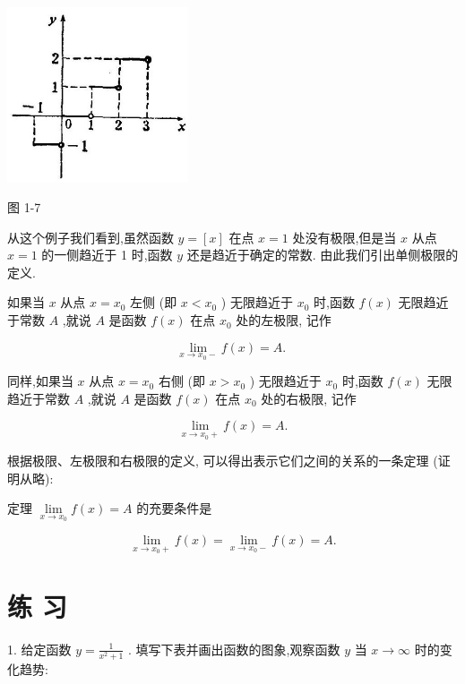 \documentclass[10pt]{article}
\begin{document}
\begin{center}
\includegraphics[max width=0.4\textwidth]{images/01912c18-5c3f-733d-b775-749ba9897a9d_25_214056.jpg}
\end{center}

图 1-7

从这个例子我们看到,虽然函数 \(y = \left\lbrack x\right\rbrack\) 在点 \(x = 1\) 处没有极限,但是当 \(x\) 从点 \(x = 1\) 的一侧趋近于 1 时,函数 \(y\) 还是趋近于确定的常数. 由此我们引出单侧极限的定义.

如果当 \(x\) 从点 \(x = {x}_{0}\) 左侧 (即 \(x < {x}_{0}\) ) 无限趋近于 \({x}_{0}\) 时,函数 \(f\left( x\right)\) 无限趋近于常数 \(A\) ,就说 \(A\) 是函数 \(f\left( x\right)\) 在点 \({x}_{0}\) 处的左极限, 记作

\[
\mathop{\lim }\limits_{{x \rightarrow {x}_{0} - }}f\left( x\right) = A\text{. }
\]

同样,如果当 \(x\) 从点 \(x = {x}_{0}\) 右侧 (即 \(x > {x}_{0}\) ) 无限趋近于 \({x}_{0}\) 时,函数 \(f\left( x\right)\) 无限趋近于常数 \(A\) ,就说 \(A\) 是函数 \(f\left( x\right)\) 在点 \({x}_{0}\) 处的右极限, 记作

\[
\mathop{\lim }\limits_{{x \rightarrow {x}_{0} + }}f\left( x\right) = A.
\]

根据极限、左极限和右极限的定义, 可以得出表示它们之间的关系的一条定理 (证明从略):

定理 \(\mathop{\lim }\limits_{{x \rightarrow {x}_{0}}}f\left( x\right) = A\) 的充要条件是

\[
\mathop{\lim }\limits_{{x \rightarrow {x}_{0} + }}f\left( x\right) = \mathop{\lim }\limits_{{x \rightarrow {x}_{0} - }}f\left( x\right) = A.
\]

\section*{练 习}

1. 给定函数 \(y = \frac{1}{{x}^{2} + 1}\) . 填写下表并画出函数的图象,观察函数 \(y\) 当 \(x \rightarrow \infty\) 时的变化趋势:
\end{document}
